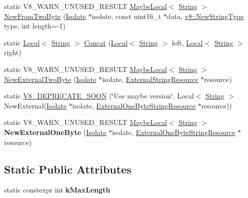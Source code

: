 \begin{DoxyCompactItemize}
\item 
static V8\+\_\+\+W\+A\+R\+N\+\_\+\+U\+N\+U\+S\+E\+D\+\_\+\+R\+E\+S\+U\+LT \mbox{\hyperlink{classv8_1_1MaybeLocal}{Maybe\+Local}}$<$ \mbox{\hyperlink{classv8_1_1String}{String}} $>$ \mbox{\hyperlink{classv8_1_1String_aaad4c7c856c29d79db85994c301fe601}{New\+From\+Two\+Byte}} (\mbox{\hyperlink{classv8_1_1Isolate}{Isolate}} $\ast$isolate, const uint16\+\_\+t $\ast$data, \mbox{\hyperlink{namespacev8_ac9163ab12fb3b2a95907a3a0367c6095}{v8\+::\+New\+String\+Type}} type, int length=-\/1)
\item 
static \mbox{\hyperlink{classv8_1_1Local}{Local}}$<$ \mbox{\hyperlink{classv8_1_1String}{String}} $>$ \mbox{\hyperlink{classv8_1_1String_ae72b61a78cef5d2916a87d9032c7fd34}{Concat}} (\mbox{\hyperlink{classv8_1_1Local}{Local}}$<$ \mbox{\hyperlink{classv8_1_1String}{String}} $>$ left, \mbox{\hyperlink{classv8_1_1Local}{Local}}$<$ \mbox{\hyperlink{classv8_1_1String}{String}} $>$ right)
\item 
static V8\+\_\+\+W\+A\+R\+N\+\_\+\+U\+N\+U\+S\+E\+D\+\_\+\+R\+E\+S\+U\+LT \mbox{\hyperlink{classv8_1_1MaybeLocal}{Maybe\+Local}}$<$ \mbox{\hyperlink{classv8_1_1String}{String}} $>$ \mbox{\hyperlink{classv8_1_1String_ad0491e4a3506df9ef9bfc08fca0d7a34}{New\+External\+Two\+Byte}} (\mbox{\hyperlink{classv8_1_1Isolate}{Isolate}} $\ast$isolate, \mbox{\hyperlink{classv8_1_1String_1_1ExternalStringResource}{External\+String\+Resource}} $\ast$resource)
\item 
static \mbox{\hyperlink{classv8_1_1String_ad7186b5cfdddffbee8235a7216f31a67}{V8\+\_\+\+D\+E\+P\+R\+E\+C\+A\+T\+E\+\_\+\+S\+O\+ON}} (\char`\"{}Use maybe version\char`\"{}, Local$<$ \mbox{\hyperlink{classv8_1_1String}{String}} $>$ New\+External(\mbox{\hyperlink{classv8_1_1Isolate}{Isolate}} $\ast$isolate, \mbox{\hyperlink{classv8_1_1String_1_1ExternalOneByteStringResource}{External\+One\+Byte\+String\+Resource}} $\ast$resource))
\item 
\mbox{\label{classv8_1_1String_a43edc2bcb1bf2a06f306ea9554042f24}} 
static V8\+\_\+\+W\+A\+R\+N\+\_\+\+U\+N\+U\+S\+E\+D\+\_\+\+R\+E\+S\+U\+LT \mbox{\hyperlink{classv8_1_1MaybeLocal}{Maybe\+Local}}$<$ \mbox{\hyperlink{classv8_1_1String}{String}} $>$ {\bfseries New\+External\+One\+Byte} (\mbox{\hyperlink{classv8_1_1Isolate}{Isolate}} $\ast$isolate, \mbox{\hyperlink{classv8_1_1String_1_1ExternalOneByteStringResource}{External\+One\+Byte\+String\+Resource}} $\ast$resource)
\end{DoxyCompactItemize}
\subsection*{Static Public Attributes}
\begin{DoxyCompactItemize}
\item 
static constexpr int {\bfseries k\+Max\+Length}
\end{DoxyCompactItemize}


